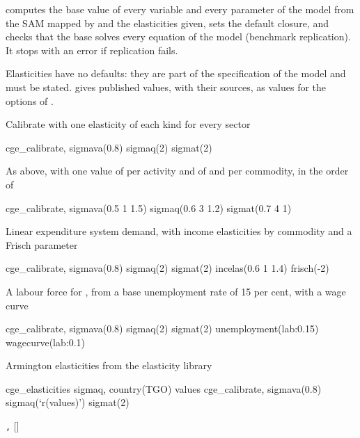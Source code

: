 

 computes the base value of every variable and every
parameter of the model from the SAM mapped by  and the
elasticities given, sets the default closure, and checks that the base solves
every equation of the model (benchmark replication). It stops with an error if
replication fails.

Elasticities have no defaults: they are part of the specification of the model
and must be stated.  gives published values, with
their sources, as values for the options of .


Calibrate with one elasticity of each kind for every sector
\begin{stcode}
cge_calibrate, sigmava(0.8) sigmaq(2) sigmat(2)
\end{stcode}
As above, with one value of  per activity and of 
and  per commodity, in the order of 
\begin{stcode}
cge_calibrate, sigmava(0.5 1 1.5) sigmaq(0.6 3 1.2) sigmat(0.7 4 1)
\end{stcode}
Linear expenditure system demand, with income elasticities by commodity and a
Frisch parameter
\begin{stcode}
cge_calibrate, sigmava(0.8) sigmaq(2) sigmat(2) incelas(0.6 1 1.4) frisch(-2)
\end{stcode}
A labour force for , from a base unemployment rate of 15 per cent,
with a wage curve
\begin{stcode}
cge_calibrate, sigmava(0.8) sigmaq(2) sigmat(2) unemployment(lab:0.15) wagecurve(lab:0.1)
\end{stcode}
Armington elasticities from the elasticity library
\begin{stcode}
cge_elasticities sigmaq, country(TGO) values
cge_calibrate, sigmava(0.8) sigmaq(`r(values)') sigmat(2)
\end{stcode}


\begin{stsyntax}
\texttt{,} 
  []
\end{stsyntax}

